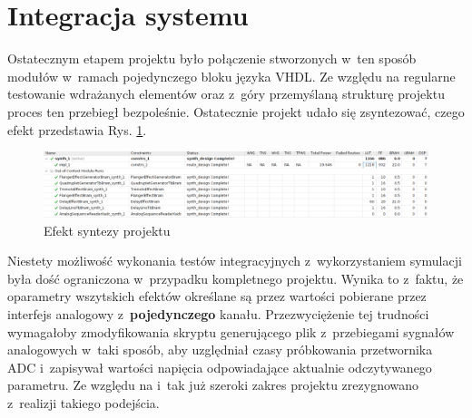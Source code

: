\section{Integracja systemu}

Ostatecznym etapem projektu było połączenie stworzonych w~ten sposób modułów w~ramach pojedynczego bloku języka VHDL. Ze względu na regularne testowanie wdrażanych elementów oraz z~góry przemyślaną strukturę projektu proces ten przebiegł bezpoleśnie. Ostatecznie projekt udało się zsyntezować, czego efekt przedstawia Rys. \ref{synthesis}.

\vspace{0.5cm}
\begin{figure}[ht]
    \centering
    \includegraphics[width=\textwidth]{img/implementation.png}
    \captionsetup{format=plain,justification=centering}
    \caption{Efekt syntezy projektu}
    \label{synthesis}
\end{figure}
\vspace{0.5cm}

Niestety możliwość wykonania testów integracyjnych z~wykorzystaniem symulacji była dość ograniczona w~przypadku kompletnego projektu. Wynika to z~faktu, że oparametry wszytskich efektów określane są przez wartości pobierane przez interfejs analogowy z~\textbf{pojedynczego} kanału. Przezwyciężenie tej trudności wymagałoby zmodyfikowania skryptu generującego plik z~przebiegami sygnałów analogowych w~taki sposób, aby uzględniał czasy próbkowania przetwornika ADC i~zapisywał wartości napięcia odpowiadające aktualnie odczytywanego parametru. Ze względu na i~tak już szeroki zakres projektu zrezygnowano z~realizji takiego podejścia.
